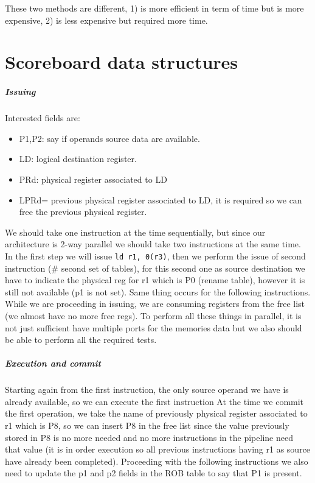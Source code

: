 These two methods are different, 1) is more efficient in term of time but is more expensive, 2) is less expensive but required more time.

\section{Scoreboard data structures}

\subparagraph{Issuing}
Interested fields are:
\begin{itemize}
\item P1,P2: say if operands source data are available.
\item LD: logical destination register.
\item PRd: physical register associated to LD
\item LPRd= previous physical register associated to LD, it is required so we can free the previous physical register.
\end{itemize}


We should take one instruction at the time sequentially, but since our architecture is 2-way parallel we should take two instructions at the same time. In the first step we will issue \verb|ld r1, 0(r3)|, then we perform the issue of second instruction (\# second set of tables), for this second one as source destination we have to indicate the physical reg for r1 which is P0 (rename table), however it is still not available (p1 is not set). Same thing occurs for the following instructions. While we are proceeding in issuing, we are consuming registers from the free list (we almost have no more free regs). To perform all these things in parallel, it is not just sufficient have multiple ports for the memories data but we also should be able to perform all the required tests.

\subparagraph{Execution and commit}
Starting again from the first instruction, the only source operand we have is already available, so we can execute the first instruction At the time we commit the first operation, we take the name of previously physical register associated to r1 which is P8, so we can insert P8 in the free list since the value previously stored in P8 is no more needed and no more instructions in the pipeline need that value (it is in order execution so all previous instructions having r1 as source have already been completed). Proceeding with the following instructions we also need to update the p1 and p2 fields in the ROB table to say that P1 is present.


